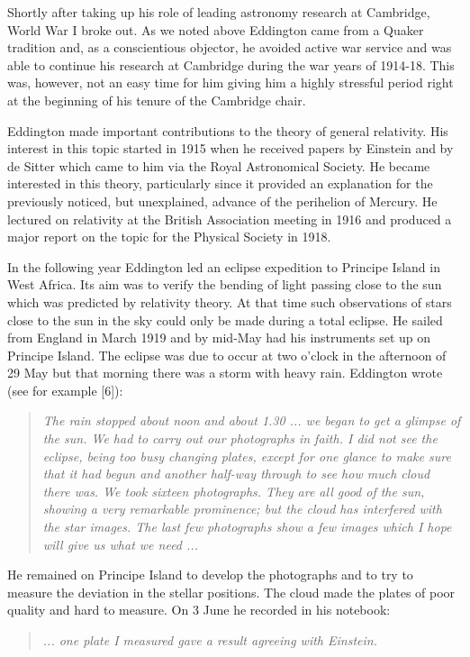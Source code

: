 Shortly after taking up his role of leading astronomy research at Cambridge, World War I broke out. As we noted above Eddington came from a Quaker tradition and, as a conscientious objector, he avoided active war service and was able to continue his research at Cambridge during the war years of 1914-18. This was, however, not an easy time for him giving him a highly stressful period right at the beginning of his tenure of the Cambridge chair.

Eddington made important contributions to the theory of general relativity. His interest in this topic started in 1915 when he received papers by Einstein and by de Sitter which came to him via the Royal Astronomical Society. He became interested in this theory, particularly since it provided an explanation for the previously noticed, but unexplained, advance of the perihelion of Mercury. He lectured on relativity at the British Association meeting in 1916 and produced a major report on the topic for the Physical Society in 1918.

In the following year Eddington led an eclipse expedition to Principe Island in West Africa. Its aim was to verify the bending of light passing close to the sun which was predicted by relativity theory. At that time such observations of stars close to the sun in the sky could only be made during a total eclipse. He sailed from England in March 1919 and by mid-May had his instruments set up on Principe Island. The eclipse was due to occur at two o'clock in the afternoon of 29 May but that morning there was a storm with heavy rain. Eddington wrote (see for example [6]):
\begin{quote}
\textit{The rain stopped about noon and about 1.30 ... we began to get a glimpse of the sun. We had to carry out our photographs in faith. I did not see the eclipse, being too busy changing plates, except for one glance to make sure that it had begun and another half-way through to see how much cloud there was. We took sixteen photographs. They are all good of the sun, showing a very remarkable prominence; but the cloud has interfered with the star images. The last few photographs show a few images which I hope will give us what we need ...}
\end{quote}

He remained on Principe Island to develop the photographs and to try to measure the deviation in the stellar positions. The cloud made the plates of poor quality and hard to measure. On 3 June he recorded in his notebook:
\begin{quote}
\textit{... one plate I measured gave a result agreeing with Einstein.}
\end{quote}

